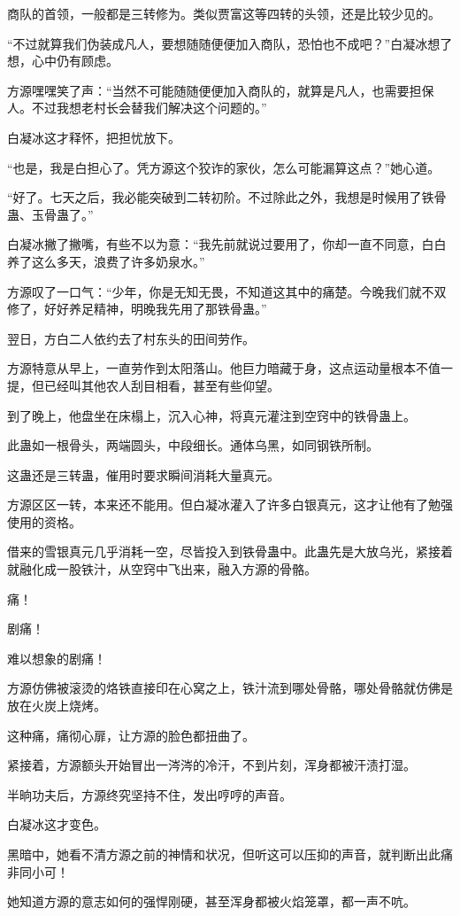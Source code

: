 \begin{this_body}
商队的首领，一般都是三转修为。类似贾富这等四转的头领，还是比较少见的。

“不过就算我们伪装成凡人，要想随随便便加入商队，恐怕也不成吧？”白凝冰想了想，心中仍有顾虑。

方源嘿嘿笑了声：“当然不可能随随便便加入商队的，就算是凡人，也需要担保人。不过我想老村长会替我们解决这个问题的。”

白凝冰这才释怀，把担忧放下。

“也是，我是白担心了。凭方源这个狡诈的家伙，怎么可能漏算这点？”她心道。

“好了。七天之后，我必能突破到二转初阶。不过除此之外，我想是时候用了铁骨蛊、玉骨蛊了。”

白凝冰撇了撇嘴，有些不以为意：“我先前就说过要用了，你却一直不同意，白白养了这么多天，浪费了许多奶泉水。”

方源叹了一口气：“少年，你是无知无畏，不知道这其中的痛楚。今晚我们就不双修了，好好养足精神，明晚我先用了那铁骨蛊。”

翌日，方白二人依约去了村东头的田间劳作。

方源特意从早上，一直劳作到太阳落山。他巨力暗藏于身，这点运动量根本不值一提，但已经叫其他农人刮目相看，甚至有些仰望。

到了晚上，他盘坐在床榻上，沉入心神，将真元灌注到空窍中的铁骨蛊上。

此蛊如一根骨头，两端圆头，中段细长。通体乌黑，如同钢铁所制。

这蛊还是三转蛊，催用时要求瞬间消耗大量真元。

方源区区一转，本来还不能用。但白凝冰灌入了许多白银真元，这才让他有了勉强使用的资格。

借来的雪银真元几乎消耗一空，尽皆投入到铁骨蛊中。此蛊先是大放乌光，紧接着就融化成一股铁汁，从空窍中飞出来，融入方源的骨骼。

痛！

剧痛！

难以想象的剧痛！

方源仿佛被滚烫的烙铁直接印在心窝之上，铁汁流到哪处骨骼，哪处骨骼就仿佛是放在火炭上烧烤。

这种痛，痛彻心扉，让方源的脸色都扭曲了。

紧接着，方源额头开始冒出一涔涔的冷汗，不到片刻，浑身都被汗渍打湿。

半晌功夫后，方源终究坚持不住，发出哼哼的声音。

白凝冰这才变色。

黑暗中，她看不清方源之前的神情和状况，但听这可以压抑的声音，就判断出此痛非同小可！

她知道方源的意志如何的强悍刚硬，甚至浑身都被火焰笼罩，都一声不吭。


\end{this_body}
